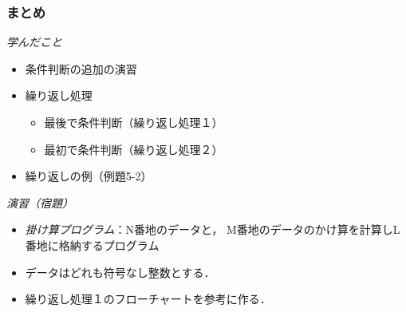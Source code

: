 \documentclass{beamer}                 %
\begin{document}
\begin{frame}
  \frametitle{まとめ}
  \emph{学んだこと}
  \begin{itemize}
  \item 条件判断の追加の演習
  \item 繰り返し処理
    \begin{itemize}
    \item 最後で条件判断（繰り返し処理１）
    \item 最初で条件判断（繰り返し処理２）
    \end{itemize}
  \item 繰り返しの例（例題5-2）
  \end{itemize}
  \vfill

  \emph{演習（宿題）}
  \begin{itemize}
  \item \emph{掛け算プログラム}：N番地のデータと，
    M番地のデータのかけ算を計算しL番地に格納するプログラム
  \item データはどれも符号なし整数とする．
  \item 繰り返し処理１のフローチャートを参考に作る．
  \end{itemize}
  \vfill
\end{frame}
\end{document}
